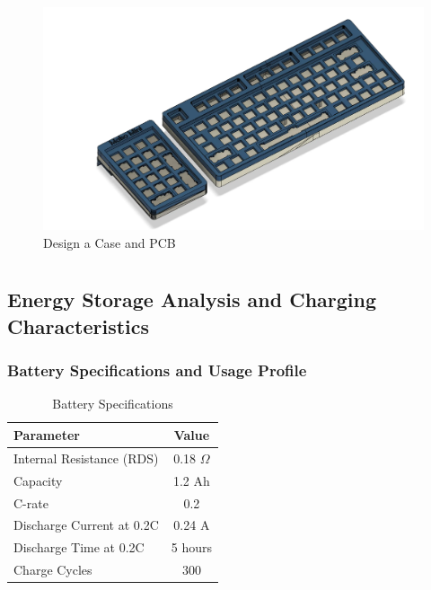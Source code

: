 \documentclass[a4paper,11pt]{article}%
\begin{document}
\begin{figure}[H]
	\centering
	\includegraphics[scale=0.17]{figures/3d_print_fusion.png}
	\caption{Design a Case and PCB}
\end{figure}

\pagebreak




\section{\color{red}{Update 3}}

\subsection{Energy Storage Analysis and Charging Characteristics}

\subsubsection{Battery Specifications and Usage Profile}

\begin{table}[h]
\centering
\begin{tabular}{|l|c|}
\hline
\textbf{Parameter} & \textbf{Value} \\
\hline
Internal Resistance (RDS) & 0.18 $\Omega$ \\
Capacity & 1.2 Ah \\
C-rate & 0.2 \\
Discharge Current at 0.2C & 0.24 A \\
Discharge Time at 0.2C & 5 hours \\
Charge Cycles & 300 \\
\hline
\end{tabular}
\caption{Battery Specifications}
\label{tab:battery_specs}
\end{table}
\end{document}
